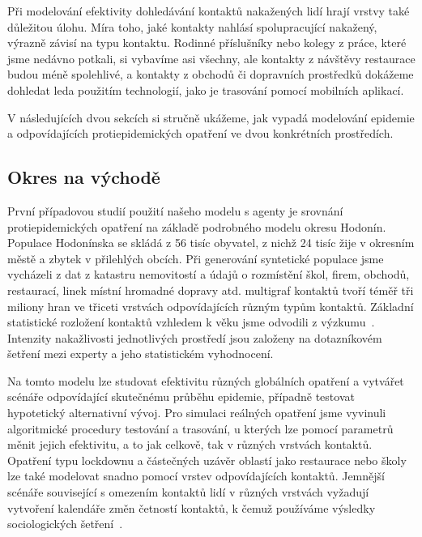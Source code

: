 Při modelování efektivity dohledávání kontaktů nakažených lidí hrají vrstvy také důležitou úlohu. Míra toho, jaké kontakty nahlásí spolupracující nakažený, výrazně závisí na typu kontaktu. Rodinné příslušníky nebo kolegy z práce, které jsme nedávno potkali, si vybavíme asi všechny, ale kontakty z návštěvy restaurace budou méně spolehlivé, a kontakty z obchodů či dopravních prostředků dokážeme dohledat leda použitím technologií, jako je trasování pomocí mobilních aplikací.

V následujících dvou sekcích si stručně ukážeme, jak vypadá modelování epidemie a odpovídajících protiepidemických opatření ve dvou konkrétních prostředích. 




\subsection*{Okres na východě}

První případovou studií použití našeho modelu s agenty je srovnání protiepidemických opatření na základě podrobného modelu okresu Hodonín. Populace Hodonínska se skládá z 56 tisíc obyvatel, z nichž 24 tisíc žije v okresním městě a zbytek v přilehlých obcích. Při generování syntetické populace jsme vycházeli z dat z katastru nemovitostí a údajů o rozmístění škol, firem, obchodů, restaurací, linek místní hromadné dopravy atd. multigraf kontaktů tvoří téměř tři miliony hran ve třiceti vrstvách odpovídajících různým typům kontaktů. Základní statistické rozložení kontaktů vzhledem k věku jsme odvodili z výzkumu~\cite{Prem_etal2017}. Intenzity nakažlivosti jednotlivých prostředí jsou založeny na dotazníkovém šetření mezi experty a jeho statistickém vyhodnocení. 

Na tomto modelu lze studovat efektivitu různých globálních opatření a vytvářet scénáře odpovídající skutečnému průběhu epidemie, případně testovat hypotetický alternativní vývoj. Pro simulaci reálných opatření jsme vyvinuli algoritmické procedury testování a trasování, u kterých lze pomocí parametrů měnit jejich efektivitu, a to jak celkově, tak v různých vrstvách kontaktů. Opatření typu lockdownu a částečných uzávěr oblastí jako restaurace nebo školy lze také modelovat snadno pomocí vrstev odpovídajících kontaktů. Jemnější scénáře související s omezením kontaktů lidí v různých vrstvách vyžadují vytvoření kalendáře změn četností kontaktů, k čemuž používáme výsledky sociologických šetření~\cite{paqcovid}.   

